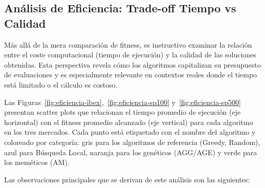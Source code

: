 \subsection{Análisis de Eficiencia: Trade-off Tiempo vs Calidad}

Más allá de la mera comparación de fitness, es instructivo examinar la relación entre el coste computacional (tiempo de ejecución) y la calidad de las soluciones obtenidas. Esta perspectiva revela cómo los algoritmos capitalizan su presupuesto de evaluaciones y es especialmente relevante en contextos reales donde el tiempo está limitado o el cálculo es costoso.

Las Figuras~\ref{fig:eficiencia-ibex},~\ref{fig:eficiencia-sp100} y~\ref{fig:eficiencia-sp500} presentan scatter plots que relacionan el tiempo promedio de ejecución (eje horizontal) con el fitness promedio alcanzado (eje vertical) para cada algoritmo en los tres mercados. Cada punto está etiquetado con el nombre del algoritmo y coloreado por categoría: gris para los algoritmos de referencia (Greedy, Random), azul para Búsqueda Local, naranja para los genéticos (AGG/AGE) y verde para los meméticos (AM).

Las observaciones principales que se derivan de este análisis son las siguientes:

